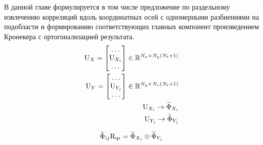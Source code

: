 В данной главе формулируется в том числе предложение по раздельному извлечению корреляций вдоль координатных осей с одномерными разбиениями на подобласти и формированию соответствующих главных компонент произведением Кронекера с ортогонализацией результата.
\begin{align}
    \matr{U}_{X} = \begin{bmatrix}
        \dots \\
        \matr{U}_{X_i}\\
         \dots
    \end{bmatrix}
    \in \mathbb{R}^{N_x \times N_y (N_{t}+1)} \\
    \matr{U}_{Y} = \begin{bmatrix}
        \dots \\
        \matr{U}_{Y_j}\\
         \dots
    \end{bmatrix}
    \in \mathbb{R}^{N_y \times N_x (N_{t}+1)} \\
    \matr{U}_{X_i} \rightarrow \widetilde{\Phi}_{X_i} \\
    \matr{U}_{Y_j} \rightarrow \widetilde{\Phi}_{Y_j}
\end{align}

\begin{align}
    \widetilde{\Phi}_{ij} \matr{R}_\text{qr}
    = \widetilde{\Phi}_{X_i} \otimes \widetilde{\Phi}_{Y_j}
\end{align}

